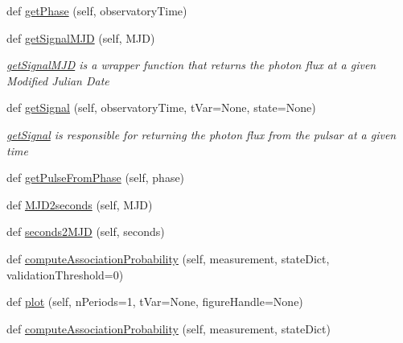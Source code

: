\begin{DoxyCompactItemize}
\item 
def \hyperlink{classmodest_1_1signals_1_1xraysource_1_1PeriodicXRaySource_a3ea2f37c1387cc682819e667a8ce7f1e}{get\+Phase} (self, observatory\+Time)
\item 
def \hyperlink{classmodest_1_1signals_1_1xraysource_1_1PeriodicXRaySource_a9949b9a2d7a2ed0e4bb731e3e4fb7d2f}{get\+Signal\+M\+JD} (self, M\+JD)
\begin{DoxyCompactList}\small\item\em \hyperlink{classmodest_1_1signals_1_1xraysource_1_1PeriodicXRaySource_a9949b9a2d7a2ed0e4bb731e3e4fb7d2f}{get\+Signal\+M\+JD} is a wrapper function that returns the photon flux at a given Modified Julian Date \end{DoxyCompactList}\item 
def \hyperlink{classmodest_1_1signals_1_1xraysource_1_1PeriodicXRaySource_ac446c2e2083dbd59865c96c34dd6623f}{get\+Signal} (self, observatory\+Time, t\+Var=None, state=None)
\begin{DoxyCompactList}\small\item\em \hyperlink{classmodest_1_1signals_1_1xraysource_1_1PeriodicXRaySource_ac446c2e2083dbd59865c96c34dd6623f}{get\+Signal} is responsible for returning the photon flux from the pulsar at a given time \end{DoxyCompactList}\item 
def \hyperlink{classmodest_1_1signals_1_1xraysource_1_1PeriodicXRaySource_a252850e9966b3281a193c834cb687646}{get\+Pulse\+From\+Phase} (self, phase)
\item 
def \hyperlink{classmodest_1_1signals_1_1xraysource_1_1PeriodicXRaySource_abdd0337b42d16288c8ad3dede15a99f2}{M\+J\+D2seconds} (self, M\+JD)
\item 
def \hyperlink{classmodest_1_1signals_1_1xraysource_1_1PeriodicXRaySource_a023967f167c21ca3a6020eb36dd7a7d7}{seconds2\+M\+JD} (self, seconds)
\item 
def \hyperlink{classmodest_1_1signals_1_1xraysource_1_1PeriodicXRaySource_ae9e8cdc926982f0cfbf038b6857a5c83}{compute\+Association\+Probability} (self, measurement, state\+Dict, validation\+Threshold=0)
\item 
def \hyperlink{classmodest_1_1signals_1_1xraysource_1_1PeriodicXRaySource_a640937825e6219bc7cc27168ed0e7fb0}{plot} (self, n\+Periods=1, t\+Var=None, figure\+Handle=None)
\item 
def \hyperlink{classmodest_1_1signals_1_1poissonsource_1_1DynamicPoissonSource_a6c8820d8007c848d745f9313efdb970c}{compute\+Association\+Probability} (self, measurement, state\+Dict)

\end{DoxyCompactItemize}
